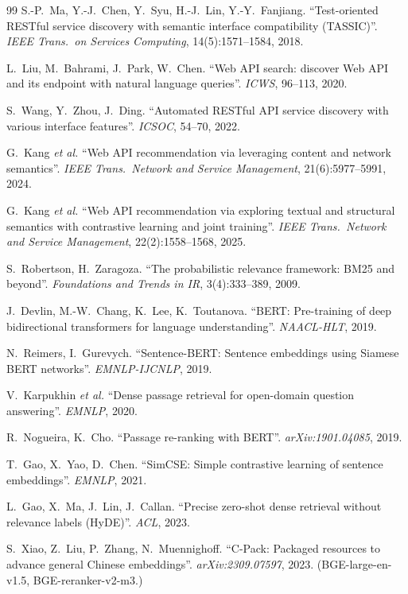 \documentclass[10pt,a4paper,twocolumn]{article}
\begin{document}
\begin{thebibliography}{99}
S.-P.~Ma, Y.-J.~Chen, Y.~Syu, H.-J.~Lin, Y.-Y.~Fanjiang.
``Test-oriented RESTful service discovery with semantic interface
compatibility (TASSIC)''.
\textit{IEEE Trans.\ on Services Computing},
14(5):1571--1584, 2018.

L.~Liu, M.~Bahrami, J.~Park, W.~Chen.
``Web API search: discover Web API and its endpoint with natural
language queries''.
\textit{ICWS}, 96--113, 2020.

S.~Wang, Y.~Zhou, J.~Ding.
``Automated RESTful API service discovery with various interface
features''.
\textit{ICSOC}, 54--70, 2022.

G.~Kang \textit{et al.}
``Web API recommendation via leveraging content and network
semantics''.
\textit{IEEE Trans.\ Network and Service Management},
21(6):5977--5991, 2024.

G.~Kang \textit{et al.}
``Web API recommendation via exploring textual and structural
semantics with contrastive learning and joint training''.
\textit{IEEE Trans.\ Network and Service Management},
22(2):1558--1568, 2025.

S.~Robertson, H.~Zaragoza.
``The probabilistic relevance framework: BM25 and beyond''.
\textit{Foundations and Trends in IR}, 3(4):333--389, 2009.

J.~Devlin, M.-W.~Chang, K.~Lee, K.~Toutanova.
``BERT: Pre-training of deep bidirectional transformers for
language understanding''.
\textit{NAACL-HLT}, 2019.

N.~Reimers, I.~Gurevych.
``Sentence-BERT: Sentence embeddings using Siamese BERT networks''.
\textit{EMNLP-IJCNLP}, 2019.

V.~Karpukhin \textit{et al.}
``Dense passage retrieval for open-domain question answering''.
\textit{EMNLP}, 2020.

R.~Nogueira, K.~Cho.
``Passage re-ranking with BERT''.
\textit{arXiv:1901.04085}, 2019.

T.~Gao, X.~Yao, D.~Chen.
``SimCSE: Simple contrastive learning of sentence embeddings''.
\textit{EMNLP}, 2021.

L.~Gao, X.~Ma, J.~Lin, J.~Callan.
``Precise zero-shot dense retrieval without relevance labels (HyDE)''.
\textit{ACL}, 2023.

S.~Xiao, Z.~Liu, P.~Zhang, N.~Muennighoff.
``C-Pack: Packaged resources to advance general Chinese embeddings''.
\textit{arXiv:2309.07597}, 2023.
(BGE-large-en-v1.5, BGE-reranker-v2-m3.)


\end{thebibliography}
\end{document}
